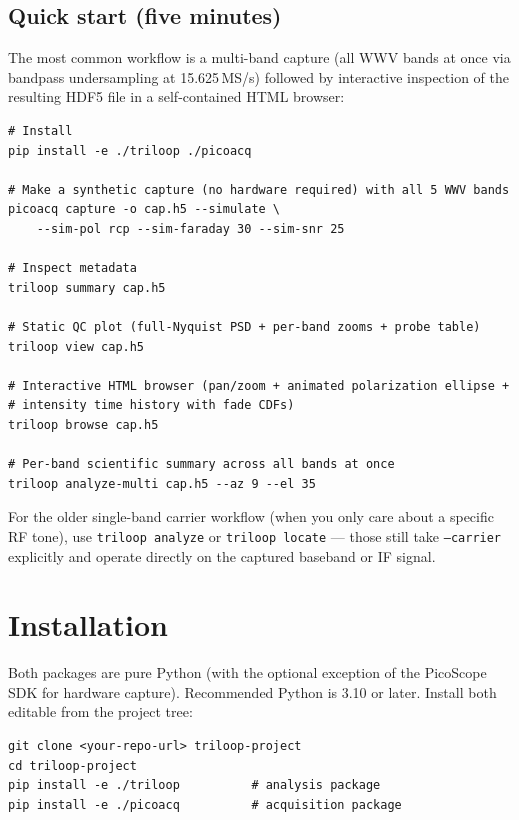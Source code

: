 \documentclass[11pt]{article}
\begin{document}
\subsection{Quick start (five minutes)}

The most common workflow is a multi-band capture (all WWV bands at once
via bandpass undersampling at 15.625\,MS/s) followed by interactive
inspection of the resulting HDF5 file in a self-contained HTML browser:

\begin{lstlisting}[style=shell]
# Install
pip install -e ./triloop ./picoacq

# Make a synthetic capture (no hardware required) with all 5 WWV bands
picoacq capture -o cap.h5 --simulate \
    --sim-pol rcp --sim-faraday 30 --sim-snr 25

# Inspect metadata
triloop summary cap.h5

# Static QC plot (full-Nyquist PSD + per-band zooms + probe table)
triloop view cap.h5

# Interactive HTML browser (pan/zoom + animated polarization ellipse +
# intensity time history with fade CDFs)
triloop browse cap.h5

# Per-band scientific summary across all bands at once
triloop analyze-multi cap.h5 --az 9 --el 35
\end{lstlisting}

For the older single-band carrier workflow (when you only care about a
specific RF tone), use \texttt{triloop analyze} or
\texttt{triloop locate} — those still take \texttt{--carrier} explicitly
and operate directly on the captured baseband or IF signal.

\section{Installation}

Both packages are pure Python (with the optional exception of the
PicoScope SDK for hardware capture).  Recommended Python is 3.10 or
later.  Install both editable from the project tree:

\begin{lstlisting}[style=shell]
git clone <your-repo-url> triloop-project
cd triloop-project
pip install -e ./triloop          # analysis package
pip install -e ./picoacq          # acquisition package
\end{lstlisting}
\end{document}
